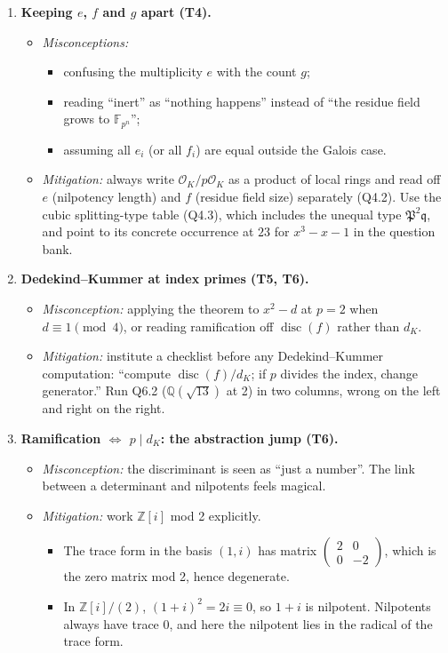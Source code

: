 \documentclass[11pt]{article}
\newcommand{\Z}{\mathbb{Z}}
\newcommand{\Q}{\mathbb{Q}}
\newcommand{\F}{\mathbb{F}}
\newcommand{\OK}{\mathcal{O}_K}
\newcommand{\fP}{\mathfrak{P}}
\newcommand{\fq}{\mathfrak{q}}
\DeclareMathOperator{\disc}{disc}
\begin{document}
\begin{enumerate}[label=\textbf{D\arabic*.}]
  \item \textbf{Keeping $e$, $f$ and $g$ apart (T4).}
  \begin{itemize}
    \item \emph{Misconceptions:}
    \begin{itemize}
      \item confusing the multiplicity $e$ with the count $g$;
      \item reading ``inert'' as ``nothing happens'' instead of ``the residue field grows to $\F_{p^n}$'';
      \item assuming all $e_i$ (or all $f_i$) are equal outside the Galois case.
    \end{itemize}
    \item \emph{Mitigation:} always write $\OK/p\OK$ as a product of local rings and read off $e$ (nilpotency length) and $f$ (residue field size) separately (Q4.2). Use the cubic splitting-type table (Q4.3), which includes the unequal type $\fP^2\fq$, and point to its concrete occurrence at $23$ for $x^3-x-1$ in the question bank.
  \end{itemize}

  \item \textbf{Dedekind--Kummer at index primes (T5, T6).}
  \begin{itemize}
    \item \emph{Misconception:} applying the theorem to $x^2-d$ at $p=2$ when $d\equiv1\pmod4$, or reading ramification off $\disc(f)$ rather than $d_K$.
    \item \emph{Mitigation:} institute a checklist before any Dedekind--Kummer computation: ``compute $\disc(f)/d_K$; if $p$ divides the index, change generator.'' Run Q6.2 ($\Q(\sqrt{13})$ at 2) in two columns, wrong on the left and right on the right.
  \end{itemize}

  \item \textbf{Ramification $\iff$ $p\mid d_K$: the abstraction jump (T6).}
  \begin{itemize}
    \item \emph{Misconception:} the discriminant is seen as ``just a number''. The link between a determinant and nilpotents feels magical.
    \item \emph{Mitigation:} work $\Z[i]$ mod 2 explicitly.
    \begin{itemize}
      \item The trace form in the basis $(1,i)$ has matrix $\begin{pmatrix}2&0\\0&-2\end{pmatrix}$, which is the zero matrix mod 2, hence degenerate.
      \item In $\Z[i]/(2)$, $(1+i)^2=2i\equiv0$, so $1+i$ is nilpotent. Nilpotents always have trace $0$, and here the nilpotent lies in the radical of the trace form.
    \end{itemize}
  \end{itemize}


\end{enumerate}
\end{document}
